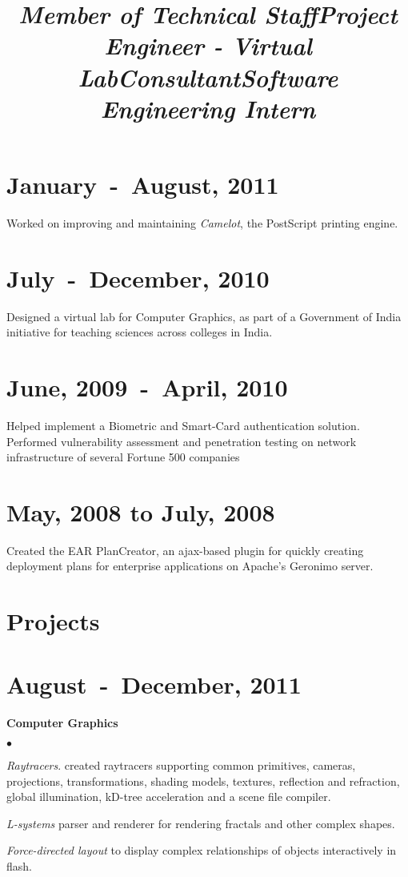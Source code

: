\documentclass[margin,line]{res}
\newcommand{\datesection}[1]{\section{\textnormal{\scriptsize \textcolor{subtle}{#1}}}}
\newenvironment{list2}{
  \begin{list}{$\bullet$}{%
      \setlength{\itemsep}{0in}
      \setlength{\parsep}{0in} \setlength{\parskip}{0in}
      \setlength{\topsep}{0in} \setlength{\partopsep}{0in} 
      \setlength{\leftmargin}{0.2in}}}{\end{list}}
\begin{document}
\begin{resume}
\datesection{January~-~August, 2011}
\title{\em Member of Technical Staff}
\begin{position}
Worked on improving and maintaining \textit{Camelot}, the PostScript printing engine.
\end{position}

\datesection{July~-~December, 2010}
\title{\em Project Engineer - Virtual Lab}
\begin{position}
Designed a virtual lab for Computer Graphics, as part of a Government of India initiative for teaching sciences across colleges in India.
\end{position}

\datesection{June, 2009~-~April, 2010}
\title{\em Consultant}
\begin{position}
Helped implement a Biometric and Smart-Card authentication solution. \\
Performed vulnerability assessment and penetration testing on network infrastructure of several Fortune 500 companies
\end{position}

\datesection{May, 2008 to July, 2008}
\title{\em Software Engineering Intern}
\begin{position}
Created the EAR PlanCreator, an ajax-based plugin for quickly creating deployment plans for enterprise applications on Apache's Geronimo server.
\end{position}

\section{\sc Projects}
\datesection{August~-~December, 2011}
{\bf Computer Graphics}
\begin{list2}
\item {\em Raytracers}. created raytracers supporting common primitives, cameras, projections, transformations,
shading models, textures, reflection and refraction, global illumination, kD-tree acceleration and a scene file compiler.
\item {\em L-systems} parser and renderer for rendering fractals and other complex shapes.
\item {\em Force-directed layout} to display complex relationships of objects interactively in flash.
\end{list2}


\end{resume}
\end{document}
